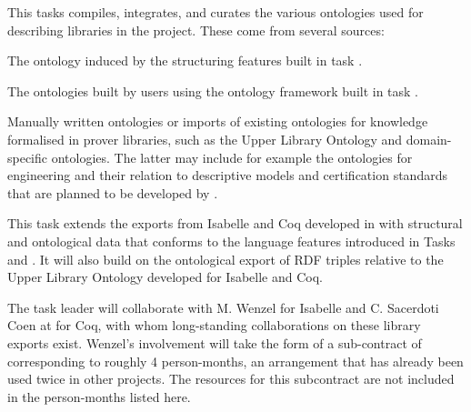 \begin{workpackage}
\begin{tasklist}
\begin{task}[id=strrefonto,title=Reference Ontology,shorttitle=Ref. Ont.,lead=Sac,FauRM=6,SacRM=6,TouRM=8,wphases=12-36!.5]
This tasks compiles, integrates, and curates the various ontologies used for describing libraries in the project.
These come from several sources:
\begin{compactitem}
 \item The ontology induced by the structuring features built in task .
 \item The ontologies built by users using the ontology framework built in task .
 \item Manually written ontologies or imports of existing ontologies for knowledge formalised in prover libraries, such as the Upper Library Ontology
and domain-specific ontologies.
 The latter may include for example the ontologies for engineering and their relation to descriptive models and certification standards that are planned to be developed by .
\end{compactitem}
\end{task}

\begin{task}[id=strontorepml,title=Ontological Representation of Formal Libraries,shorttitle=Ont. Repr.,lead=Fau,FauRM=11,BolRM=5,SacRM=4,wphases=12-48!.5]
  This task extends the exports from Isabelle and Coq developed in
   with structural and ontological data that conforms to the language features introduced in Tasks~ and .
  It will also build on the ontological export of RDF triples relative to
the Upper Library Ontology developed for Isabelle and Coq.

The task leader will collaborate with M. Wenzel for Isabelle and C. Sacerdoti Coen at  for Coq, with whom long-standing collaborations on these library exports exist.
Wenzel's involvement will take the form of a sub-contract of
 corresponding to roughly 4 person-months, an arrangement
that has already been used twice in other projects.  The resources for
this subcontract are not included in the person-months listed here.
\end{task}



\end{tasklist}
\end{workpackage}
